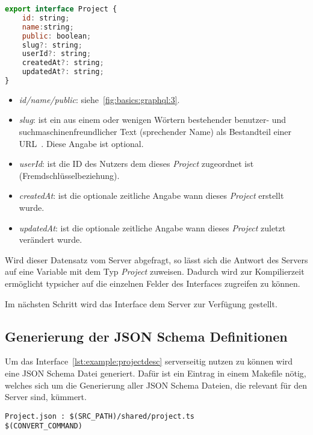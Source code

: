 \begin{lstlisting}[language=JavaScript,float=h!,caption={TypeScript Interface für die Darstellung eines Projektes}, label={lst:example:projectdesc}]
export interface Project {
    id: string;
    name:string;
    public: boolean;
    slug?: string;
    userId?: string;
    createdAt?: string;
    updatedAt?: string;
}
\end{lstlisting}

\begin{itemize}
    \setlength\itemsep{-1em}
    \item \emph{id/name/public}: siehe~\ref{fig:basics:graphql:3}.
    \item \emph{slug}: ist ein aus einem oder wenigen Wörtern bestehender benutzer- und suchmaschinenfreundlicher
    Text (sprechender Name) als Bestandteil einer URL~\cite{slug-wikipedia}. Diese Angabe ist optional.
    \item \emph{userId}: ist die ID des Nutzers dem dieses \emph{Project} zugeordnet ist (Fremdschlüsselbeziehung).
    \item \emph{createdAt}: ist die optionale zeitliche Angabe wann dieses \emph{Project} erstellt wurde.
    \item \emph{updatedAt}: ist die optionale zeitliche Angabe wann dieses \emph{Project} zuletzt verändert wurde.
\end{itemize}

Wird dieser Datensatz vom Server abgefragt, so lässt sich die Antwort des Servers auf eine Variable mit dem Typ \emph{Project} zuweisen.
Dadurch wird zur Kompilierzeit ermöglicht typsicher auf die einzelnen Felder des Interfaces zugreifen zu können.

Im nächsten Schritt wird das Interface dem Server zur Verfügung gestellt.

\subsection{Generierung der JSON Schema Definitionen}
\label{sec:requirements:example:schema}
\label{}
Um das Interface~\ref{lst:example:projectdesc} serverseitig nutzen zu können wird eine JSON Schema Datei generiert.
Dafür ist ein Eintrag in einem Makefile nötig, welches sich um die Generierung aller JSON Schema Dateien,
die relevant für den Server sind, kümmert.

\begin{lstlisting}[float=h!,caption={TypeScript Interface für die Project Darstellung in einer Liste}, label={lst:example:makefile}]
Project.json : $(SRC_PATH)/shared/project.ts
$(CONVERT_COMMAND)
\end{lstlisting}

